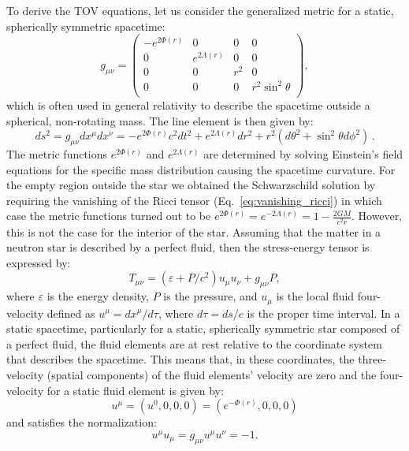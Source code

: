 \documentclass[main.tex]{subfiles}
\begin{document}
    To derive the TOV equations, let us consider the generalized metric for a static, spherically symmetric spacetime:
    \begin{equation}\label{eq:generalized_metric}
        g_{\mu\nu} = 
        \begin{pmatrix}
        -e^{2\Phi(r)} & 0 & 0 & 0 \\
        0 & e^{2\Lambda(r)} & 0 & 0 \\
        0 & 0 & r^2 & 0 \\
        0 & 0 & 0 & r^2\sin^2\theta \\
        \end{pmatrix},
    \end{equation}
    which is often used in general relativity to describe the spacetime outside a spherical, non-rotating mass. The line element is then given by:
    \begin{equation}
        \label{eq:generalized_line_element}
        ds^2 = g_{\mu \nu} dx^\mu dx^\nu = -e^{2\Phi(r)}c^2dt^2 + e^{2\Lambda(r)}dr^2 + r^2(d\theta^2 + \sin^2\theta d\phi^2)\,.
    \end{equation}
    The metric functions $e^{2\Phi(r)}$ and $e^{2\Lambda(r)}$ are determined by solving Einstein's field equations for the specific mass distribution causing the spacetime curvature. For the empty region outside the star we obtained the Schwarzschild solution by requiring the vanishing of the Ricci tensor (Eq.~\ref{eq:vanishing_ricci}) in which case the metric functions turned out to be $e^{2\Phi(r)} = e^{-2\Lambda(r)} = 1 - \frac{2GM}{c^2r}$. However, this is not the case for the interior of the star. Assuming that the matter in a neutron star is described by a perfect fluid, then the stress-energy tensor is expressed by:
    \begin{equation}
        T_{\mu \nu} = (\varepsilon + P/c^2)u_\mu u_\nu + g_{\mu \nu} P,
    \end{equation}
    where $\varepsilon$ is the energy density, $P$ is the pressure, and $u_\mu$ is the local fluid four-velocity defined as $u^{\mu} = dx^\mu/d\tau$, where $d\tau = ds/c$ is the proper time interval.
    In a static spacetime, particularly for a static, spherically symmetric star composed of a perfect fluid, the fluid elements are at rest relative to the coordinate system that describes the spacetime. This means that, in these coordinates, the three-velocity (spatial components) of the fluid elements' velocity are zero and the four-velocity for a static fluid element is given by:
    \begin{equation}
        u^\mu = (u^0, 0, 0, 0) = (e^{-\Phi(r)}, 0, 0, 0)
    \end{equation}
    and satisfies the normalization:
    \begin{equation}
        u^\mu u_\mu = g_{\mu \nu} u^\mu u^\nu = -1.
    \end{equation}
\end{document}
